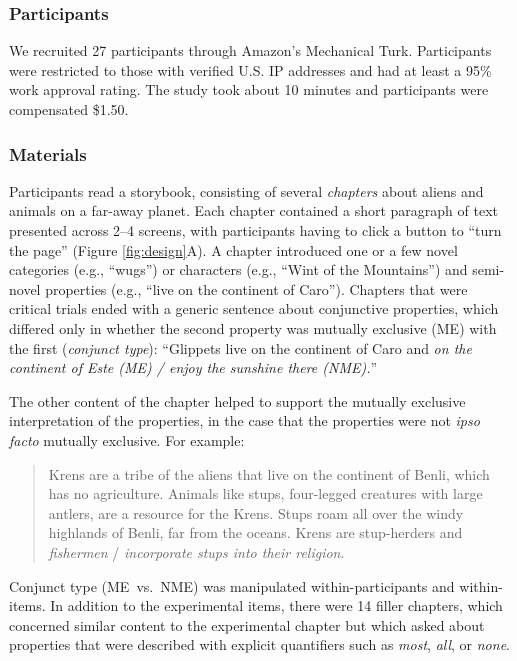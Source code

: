 \documentclass[10pt,letterpaper]{article}
\begin{document}
\subsubsection{Participants}
We recruited 27 participants through Amazon's Mechanical Turk.
Participants were restricted to those with verified U.S. IP addresses and had at least a 95\% work approval rating. 
The study took about 10 minutes and participants were compensated \$1.50.

\subsubsection{Materials}

Participants read a storybook, consisting of several \emph{chapters} about aliens and animals on a far-away planet.
Each chapter contained a short paragraph of text presented across 2--4 screens, with participants having to click a button to ``turn the page'' (Figure \ref{fig:design}A).
A chapter introduced one or a few novel categories (e.g., ``wugs'') or characters (e.g., ``Wint of the Mountains'') and semi-novel properties (e.g., ``live on the continent of Caro'').
Chapters that were critical trials ended with a generic sentence about conjunctive properties, which differed only in whether the second property was mutually exclusive (ME) with the first (\emph{conjunct type}): ``Glippets live on the continent of Caro and \emph{on the continent of Este (ME) /  enjoy the sunshine there (NME).}''

The other content of the chapter helped to support the mutually exclusive interpretation of the properties, in the case that the properties were not \emph{ipso facto} mutually exclusive. For example: 

\begin{quote}
\small
Krens are a tribe of the aliens that live on the continent of Benli, which has no agriculture. Animals like stups, four-legged creatures with large antlers, are a resource for the Krens. Stups roam all over the windy highlands of Benli, far from the oceans. Krens are stup-herders and \emph{fishermen} / \emph{incorporate stups into their religion}.
\end{quote}


Conjunct type (ME~vs.~NME) was manipulated within-participants and within-items. 
In addition to the experimental items, there were 14 filler chapters, which concerned similar content to the experimental chapter but which asked about properties that were described with explicit quantifiers such as \emph{most}, \emph{all}, or \emph{none}. 
\end{document}
